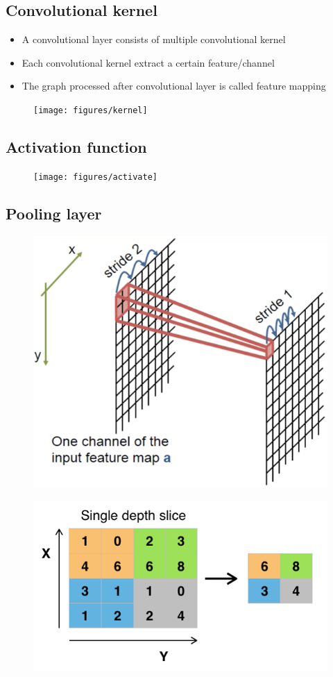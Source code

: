 \subsection{Convolutional kernel}

\begin{itemize}
\item A convolutional layer consists of multiple convolutional kernel
\item Each convolutional kernel extract a certain feature/channel
\item The graph processed after convolutional layer is called feature mapping
\end{itemize}


\begin{figure}[H]
\centering
\texttt{[image: figures/kernel]}
\end{figure}




\subsection{Activation function}
\begin{figure}[H]
\centering
\texttt{[image: figures/activate]}
\end{figure}



\subsection{Pooling layer}
\begin{figure}[H]
\centering
\includegraphics[width=.6\textwidth]{figures/PoolingLayer1}
\end{figure}

\begin{figure}[H]
\centering
\includegraphics[width=.6\textwidth]{figures/PoolingLayer2}
\end{figure}



